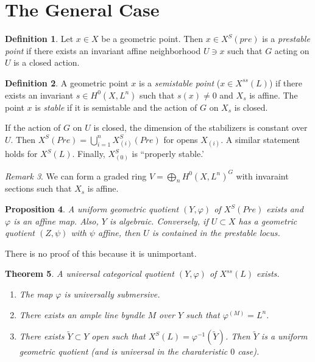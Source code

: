 \documentclass[leqno, openany]{memoir}
\newtheorem{thm}{Theorem}[section]
\newtheorem{prop}[thm]{Proposition}
\theoremstyle{definition}
\newtheorem{defn}[thm]{Definition}
\theoremstyle{remark}
\newtheorem{rmk}[thm]{Remark}
\theoremstyle{plain}
\theoremstyle{definition}
\theoremstyle{remark}
\newcommand{\wt}[1]{\widetilde{#1}}
\begin{document}
\section{The General Case}%

\begin{defn} Let $x \in X$ be a geometric point. Then $x \in X^S(pre)$ is a
\textit{prestable point}  if there exists an invariant affine neighborhood $U
\ni x$ such that $G$ acting on $U$ is a closed action.  \end{defn}

\begin{defn} A geometric point $x$ is a \textit{semistable point} ($x \in
    X^{ss}(L)$) if there exists an invariant $s \in H^0(X,L^n)$ such that $s(x)
    \neq 0$ and $X_s$ is affine. The point $x$ is \textit{stable} if it is
    semistable and the action of $G$ on $X_s$ is closed.  \end{defn}

If the action of $G$ on $U$ is closed, the dimension of the stabilizers is
constant over $U$. Then $X^S(Pre) = \bigcup_{i=1}^n X_{(i)}^S(Pre)$ for opens
$X_{(i)}$. A similar statement holds for $X^S(L)$. Finally, $X_{(0)}^S$ is
``properly stable.'

\begin{rmk} We can form a graded ring $V = \bigoplus_n H^0(X, L^n)^G$ with
invaraint sections such that $X_s$ is affine.  \end{rmk}

\begin{prop} A uniform geometric quotient $(Y, \varphi)$ of $X^S(Pre)$ exists
    and $\varphi$ is an affine map. Also, $Y$ is algebraic. Conversely, if $U
    \subset X$ has a geometric quotient $(Z, \psi)$ with $\psi$ affine, then
    $U$ is contained in the prestable locus.  \end{prop}

There is no proof of this because it is unimportant.

\begin{thm} A universal categorical quotient $(Y, \varphi)$ of $X^{ss}(L)$
    exists.  \begin{enumerate} \item The map $\varphi$ is universally
        submersive.  \item There exists an ample line byndle $M$ over $Y$ such
        that $\varphi^(M) = L^n$.  \item There exists $\wt{Y} \subset Y$ open
        such that $X^S(L) = \varphi^{-1}(\wt{Y})$. Then $\wt{Y}$ is a uniform
        geometric quotient (and is universal in the charateristic $0$ case).
\end{enumerate} \end{thm}
\end{document}
